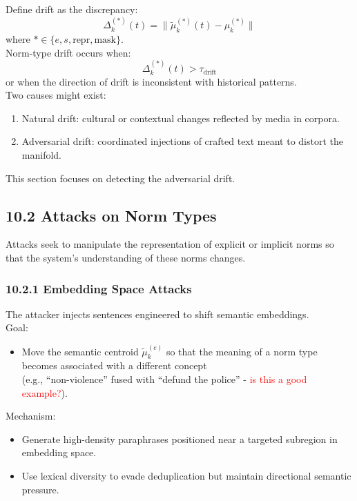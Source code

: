 \documentclass{article}
\begin{document}
Define drift as the discrepancy:
\[
\Delta_k^{(*)}(t) = \bigl\| \tilde{\mu}_k^{(*)}(t) - \mu_k^{(*)} \bigr\|
\]
where \( * \in \{e, s, \text{repr}, \text{mask} \} \).  \\

Norm-type drift occurs when:
\[
\Delta_k^{(*)}(t) > \tau_{\text{drift}}
\]
or when the direction of drift is inconsistent with historical patterns. \\

Two causes might exist:

\begin{enumerate}
    \item Natural drift: cultural or contextual changes reflected by media in corpora.
    \item Adversarial drift: coordinated injections of crafted text meant to distort the manifold.
\end{enumerate}

This section focuses on detecting the adversarial drift.

\subsection*{10.2  Attacks on Norm Types}
Attacks seek to manipulate the representation of explicit or implicit norms so that the system’s understanding of these norms changes.

\subsubsection*{10.2.1  Embedding Space Attacks}
The attacker injects sentences engineered to shift semantic embeddings.\\

Goal:
\begin{itemize}
    \item Move the semantic centroid \( \tilde{\mu}_k^{(e)} \) so that the meaning of a norm type becomes associated with a different concept \\
    (e.g., ``non-violence'' fused with ``defund the police'' - \textcolor{red}{is this a good example?}). \\
\end{itemize} 

Mechanism:
\begin{itemize}
    \item Generate high-density paraphrases positioned near a targeted subregion in embedding space.
    \item Use lexical diversity to evade deduplication but maintain directional semantic pressure. \\
\end{itemize}
\end{document}
